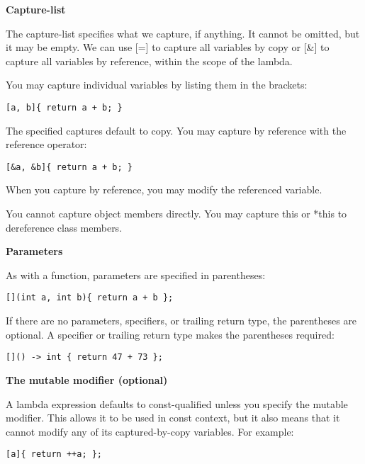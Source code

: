 \noindent
\textbf{Capture-list}

The capture-list specifies what we capture, if anything. It cannot be omitted, but it may be empty. We can use [=] to capture all variables by copy or [\&] to capture all variables by reference, within the scope of the lambda.

You may capture individual variables by listing them in the brackets:

\begin{lstlisting}[style=styleCXX]
[a, b]{ return a + b; }
\end{lstlisting}

The specified captures default to copy. You may capture by reference with the reference operator:

\begin{lstlisting}[style=styleCXX]
[&a, &b]{ return a + b; }
\end{lstlisting}

When you capture by reference, you may modify the referenced variable.

\begin{tcolorbox}[colback=webgreen!5!white,colframe=webgreen!75!black,title=Note]
You cannot capture object members directly. You may capture this or *this to dereference class members.
\end{tcolorbox}

\noindent
\textbf{Parameters}

As with a function, parameters are specified in parentheses:

\begin{lstlisting}[style=styleCXX]
[](int a, int b){ return a + b };
\end{lstlisting}

If there are no parameters, specifiers, or trailing return type, the parentheses are optional. A specifier or trailing return type makes the parentheses required:

\begin{lstlisting}[style=styleCXX]
[]() -> int { return 47 + 73 };
\end{lstlisting}

\noindent
\textbf{The mutable modifier (optional)}

A lambda expression defaults to const-qualified unless you specify the mutable modifier. This allows it to be used in const context, but it also means that it cannot modify any of its captured-by-copy variables. For example:

\begin{lstlisting}[style=styleCXX]
[a]{ return ++a; };
\end{lstlisting}

